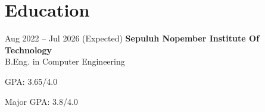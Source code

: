 \section{Education}

    \begin{twocolentry}{
        Aug 2022 – Jul 2026 (Expected)
    }
    \textbf{Sepuluh Nopember Institute Of Technology}\\
    B.Eng. in Computer Engineering\end{twocolentry}

    \vspace{0.10 cm}
    \begin{onecolentry}
        \begin{highlights}
            \item GPA: 3.65/4.0
            \item Major GPA: 3.8/4.0
        \end{highlights}
    \end{onecolentry}
